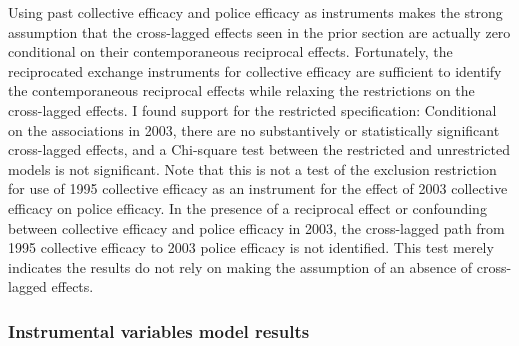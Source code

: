 \documentclass [11pt, proquest] {uwthesis}[2015/03/03]
\begin{document}
Using past collective efficacy and police efficacy as instruments makes the strong assumption that the cross-lagged effects seen in the prior section are actually zero conditional on their contemporaneous reciprocal effects. Fortunately, the reciprocated exchange instruments for collective efficacy are sufficient to identify the contemporaneous reciprocal effects while relaxing the restrictions on the cross-lagged effects. I found support for the restricted specification: Conditional on the associations in 2003, there are no substantively or statistically significant cross-lagged effects, and a Chi-square test between the restricted and unrestricted models is not significant. Note that this is not a test of the exclusion restriction for use of 1995 collective efficacy as an instrument for the effect of 2003 collective efficacy on police efficacy. In the presence of a reciprocal effect or confounding between collective efficacy and police efficacy in 2003, the cross-lagged path from 1995 collective efficacy to 2003 police efficacy is not identified. This test merely indicates the results do not rely on making the assumption of an absence of cross-lagged effects.

\hypertarget{instrumental-variables-model-results}{%
\subsubsection{Instrumental variables model results}\label{instrumental-variables-model-results}}
\end{document}

